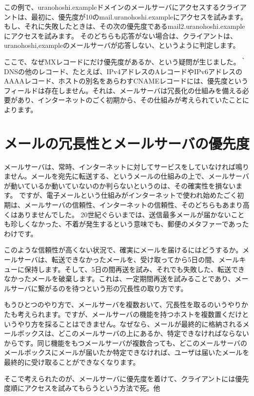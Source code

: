 この例で、uranohoshi.exampleドメインのメールサーバにアクセスするクライアントは、最初に、優先度が10のmail.uranohoshi.exampleにアクセスを試みます。もし、それに失敗したときは、その次の優先度であるmail2.uranohoshi.exampleにアクセスを試みます。
そのどちらも応答がない場合は、クライアントは、uranohoshi,exampleのメールサーバが応答しない、というように判定します。

ここで、なぜMXレコードにだけ優先度があるか、という疑問が生じました。｀DNSの他のレコード、たとえば、IPv4アドレスのAレコードやIPv6アドレスのAAAAレコード、ホストの別名をあらわすCNAMEレコードには、優先度というフィールドは存在しません。それは、メールサーバは冗長化の仕組みを備える必要があり、インターネットのごく初期から、その仕組みが考えられていたことによります。

\section{メールの冗長性とメールサーバの優先度}

メールサーバは、常時、インターネットに対してサービスをしていなければ鳴りません。メールを宛先に転送する、というメールの仕組みの上で、メールサーバが動いているか動いていないのか判らないというのは、その確実性を損ないます。
ですが、電子メールという仕組みがインターネットで使われ始めたごく初期は、メールサーバの信頼性、インターネットの信頼性、そのどちらもあまり高くはありませんでした。
20世紀ぐらいまでは、送信最多メールが届かないことも珍しくなかった、不着が発生するという意味でも、郵便のメタファーであったわけです。

このような信頼性が高くない状況で、確実にメールを届けるにはどうするか。メールサーバは、転送できなかったメールを、受け取ってから5日の間、メールキューに保持します。そして、5日の間再送を試み、それでも失敗した、転送できなかったメールを破棄します。これは、一定期間再送を試みることであり、メールサーバに繋がるのを待つという形の冗長性の取り方です。

もうひとつのやり方で、メールサーバを複数おいて、冗長性を取るのいうやりかたも考えられます。ですが、メールサーバの機能を持つホストを複数置くだけというやり方を採ることはできません。なぜなら、メールが最終的に格納されるメールボックスは、どこのメールサーバの上にあるか、特定できなければならないからです。同じ機能をもつメールサーバが複数合っても、どこのメールサーバのメールボックスにメールが届いたか特定できなければ、ユーザは届いたメールを最終的に受け取ることができなくなります。

そこで考えられたのが、メールサーバに優先度を着けて、クライアントには優先度順にアクセスを試みてもらうという方法で死。他

